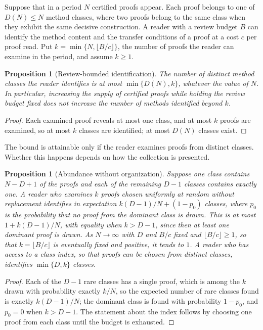 \documentclass[11pt]{book}
\newtheorem{proposition}[theorem]{Proposition}
\theoremstyle{definition}
\theoremstyle{remark}
\begin{document}
Suppose that in a period $N$ certified proofs appear. Each proof belongs to one of $D(N)\le N$ method classes, where two proofs belong to the same class when they exhibit the same decisive construction. A reader with a review budget $B$ can identify the method content and the transfer conditions of a proof at a cost $c$ per proof read. Put $k=\min\{N,\lfloor B/c\rfloor\}$, the number of proofs the reader can examine in the period, and assume $k\ge1$.

\begin{proposition}[Review-bounded identification]\label{prop:review}
The number of distinct method classes the reader identifies is at most $\min\{D(N),k\}$, whatever the value of $N$. In particular, increasing the supply of certified proofs while holding the review budget fixed does not increase the number of methods identified beyond $k$.
\end{proposition}

\begin{proof}
Each examined proof reveals at most one class, and at most $k$ proofs are examined, so at most $k$ classes are identified; at most $D(N)$ classes exist.
\end{proof}

The bound is attainable only if the reader examines proofs from distinct classes. Whether this happens depends on how the collection is presented.

\begin{proposition}[Abundance without organization]\label{prop:org}
Suppose one class contains $N-D+1$ of the proofs and each of the remaining $D-1$ classes contains exactly one. A reader who examines $k$ proofs chosen uniformly at random without replacement identifies in expectation $k(D-1)/N+(1-p_0)$ classes, where $p_0$ is the probability that no proof from the dominant class is drawn. This is at most $1+k(D-1)/N$, with equality when $k>D-1$, since then at least one dominant proof is drawn. As $N\to\infty$ with $D$ and $B/c$ fixed and $\lfloor B/c\rfloor\ge1$, so that $k=\lfloor B/c\rfloor$ is eventually fixed and positive, it tends to $1$. A reader who has access to a class index, so that proofs can be chosen from distinct classes, identifies $\min\{D,k\}$ classes.
\end{proposition}

\begin{proof}
Each of the $D-1$ rare classes has a single proof, which is among the $k$ drawn with probability exactly $k/N$, so the expected number of rare classes found is exactly $k(D-1)/N$; the dominant class is found with probability $1-p_0$, and $p_0=0$ when $k>D-1$. The statement about the index follows by choosing one proof from each class until the budget is exhausted.
\end{proof}
\end{document}
